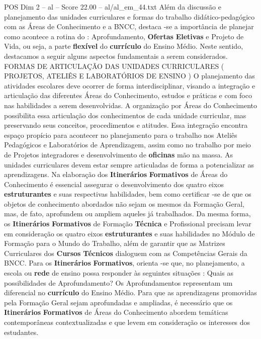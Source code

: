 \begin{textsample}{POS Dim 2 – al – Score 22.00 – al/al\_em\_44.txt}  \label{ex:f2_pos_267}
Além da discussão e planejamento das unidades curriculares e formas do trabalho didático-pedagógico com as Áreas de Conhecimento e a BNCC, destaca -se a importância de planejar como acontece a rotina do : Aprofundamento, \textbf{Ofertas} \textbf{Eletivas} e Projeto de Vida, ou seja, a parte \textbf{flexível} do \textbf{currículo} do Ensino Médio.
Neste sentido, destacamos a seguir alguns aspectos fundamentais a serem considerados.
FORMAS DE ARTICULAÇÃO DAS UNIDADES CURRICULARES ( PROJETOS, ATELIÊS E LABORATÓRIOS DE ENSINO ) O planejamento das atividades escolares deve ocorrer de forma interdisciplinar, visando a integração e articulação das diferentes Áreas do Conhecimento, estudos e práticas e com foco nas habilidades a serem desenvolvidas.
A organização por Áreas do Conhecimento possibilita essa articulação dos conhecimentos de cada unidade curricular, mas preservando seus conceitos, procedimentos e atitudes.
Essa integração encontra espaço propício para acontecer no planejamento para o trabalho nos Ateliês Pedagógicos e Laboratórios de Aprendizagem, assim como no trabalho por meio de Projetos integradores e desenvolvimento de \textbf{oficinas} mão na massa.
As unidades curriculares devem estar sempre articuladas de forma a potencializar as aprendizagens.
Na elaboração dos \textbf{Itinerários} \textbf{Formativos} de Áreas do Conhecimento é essencial assegurar o desenvolvimento dos quatro eixos \textbf{estruturantes} e suas respectivas habilidades, bem como certificar -se de que os objetos de conhecimento abordados não sejam os mesmos da Formação Geral, mas, de fato, aprofundem ou ampliem aqueles já trabalhados.
Da mesma forma, os \textbf{Itinerários} \textbf{Formativos} de Formação \textbf{Técnica} e Profissional precisam levar em consideração os quatro eixos \textbf{estruturantes} e suas habilidades no Módulo de Formação para o Mundo do Trabalho, além de garantir que as Matrizes Curriculares dos \textbf{Cursos} \textbf{Técnicos} dialoguem com as Competências Gerais da BNCC.
Para os \textbf{Itinerários} \textbf{Formativos}, orienta -se que, no planejamento, a escola ou \textbf{rede} de ensino possa responder às seguintes situações : Quais as possibilidades de Aprofundamento?
Os Aprofundamentos representam um diferencial no \textbf{currículo} do Ensino Médio.
Para que as aprendizagens promovidas pela Formação Geral sejam aprofundadas e ampliadas, é necessário que os \textbf{Itinerários} \textbf{Formativos} de Áreas do Conhecimento abordem temáticas contemporâneas contextualizadas e que levem em consideração os interesses dos estudantes.

\end{textsample}
